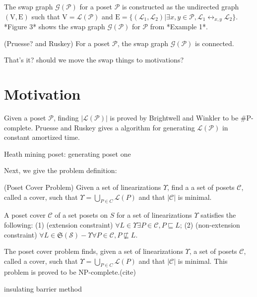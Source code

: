 \documentclass{llncs}
\begin{document}
The swap graph $\mathcal{G}(\mathcal{P})$ for a poset $\mathcal{P}$ is constructed as the undirected graph $(\mathrm{V},\mathrm{E})$ such that $\mathrm{V} = \mathcal{L}(\mathcal{P})$ and $\mathrm{E} = \{(\mathcal{L}_{1}, \mathcal{L}_{2}) | \exists x,y \in \mathcal{P}, \mathcal{L}_{1} \leftrightarrow_{x, y} \mathcal{L}_{2}\}$. *Figure 3* shows the swap graph $\mathcal{G}(\mathcal{P})$ for $\mathcal{P}$ from *Example 1*.

\begin{theorem}
    (Pruesse? and Ruskey) For a poset $\mathcal{P}$, the swap graph $\mathcal{G}(\mathcal{P})$ is connected.
\end{theorem}

That's it? should we move the swap things to motivations?

\section{Motivation}

Given a poset $\mathcal{P}$, finding $|\mathcal{L}(\mathcal{P})|$ is proved by Brightwell and Winkler to be \#P-complete. Pruesse and Ruskey gives a algorithm for generating $\mathcal{L}(\mathcal{P})$ in constant amortized time.

Heath mining poset: generating poset one

Next, we give the problem definition:

\begin{definition}
    (Poset Cover Problem) Given a set of linearizations $\Upsilon$, find a a set of posets $\mathcal{C}$, called a cover, such that $\Upsilon = \bigcup_{P \in C} \mathcal{L}(P)$ and that $|\mathcal{C}|$ is minimal.

    A poset cover $\mathcal{C}$ of a set posets on $S$ for a set of linearizations $\Upsilon$ satisfies the following: (1) (extension constraint) $\forall L \in \Upsilon \exists P \in \mathcal{C}, P \sqsubseteq L$; (2) (non-extension constraint) $\forall L \in \mathfrak{S}(\mathcal{S}) - \Upsilon \forall P \in \mathcal{C}, P \not\sqsubseteq L$.
\end{definition}
The poset cover problem finds, given a set of linearizations $\Upsilon$, a set of posets $\mathcal{C}$, called a cover, such that $\Upsilon = \bigcup_{P \in C} \mathcal{L}(P)$ and that $|\mathcal{C}|$ is minimal. This problem is proved to be NP-complete.(cite)

\begin{theorem}
    insulating barrier method
\end{theorem}
\end{document}
